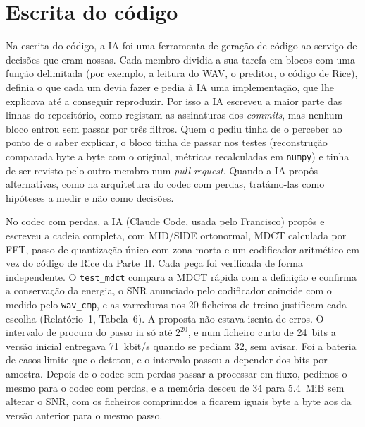 \documentclass[a4paper,11pt]{article}
\newcommand{\prog}[1]{\texttt{#1}}
\begin{document}
\section{Escrita do código}
\label{sec:codigo}
Na escrita do código, a IA foi uma ferramenta de geração de código ao serviço
de decisões que eram nossas. Cada membro dividia a sua tarefa em blocos com uma
função delimitada (por exemplo, a leitura do WAV, o preditor, o código de Rice),
definia o que cada um devia fazer e pedia à IA uma implementação, que lhe
explicava até a conseguir reproduzir. Por isso a IA escreveu a maior parte das
linhas do repositório, como registam as assinaturas dos \emph{commits}, mas
nenhum bloco entrou sem passar por três filtros. Quem o pediu tinha de o
perceber ao ponto de o saber explicar, o bloco tinha de passar nos testes
(reconstrução comparada byte a byte com o original, métricas recalculadas em
\prog{numpy}) e tinha de ser revisto pelo outro membro num \emph{pull request}.
Quando a IA propôs alternativas, como na arquitetura do codec com perdas,
tratámo-las como hipóteses a medir e não como decisões.

No codec com perdas, a IA (Claude Code, usada pelo Francisco) propôs e escreveu
a cadeia completa, com MID/SIDE ortonormal, MDCT calculada por FFT, passo de
quantização único com zona morta e um codificador aritmético em vez do código de
Rice da Parte~II. Cada peça foi verificada de forma independente. O
\prog{test\_mdct} compara a MDCT rápida com a definição e confirma a conservação
da energia, o SNR anunciado pelo codificador coincide com o medido pelo
\prog{wav\_cmp}, e as varreduras nos 20 ficheiros de treino justificam cada
escolha (Relatório~1, Tabela~6). A proposta não estava isenta de erros. O
intervalo de procura do passo ia só até $2^{20}$, e num ficheiro curto de
24~bits a versão inicial entregava \SI{71}{kbit/s} quando se pediam 32, sem
avisar. Foi a bateria de casos-limite que o detetou, e o intervalo passou a
depender dos bits por amostra. Depois de o codec sem perdas passar a processar
em fluxo, pedimos o mesmo para o codec com perdas, e a memória desceu de 34 para
\SI{5,4}{MiB} sem alterar o SNR, com os ficheiros comprimidos a ficarem iguais
byte a byte aos da versão anterior para o mesmo passo.
\end{document}
